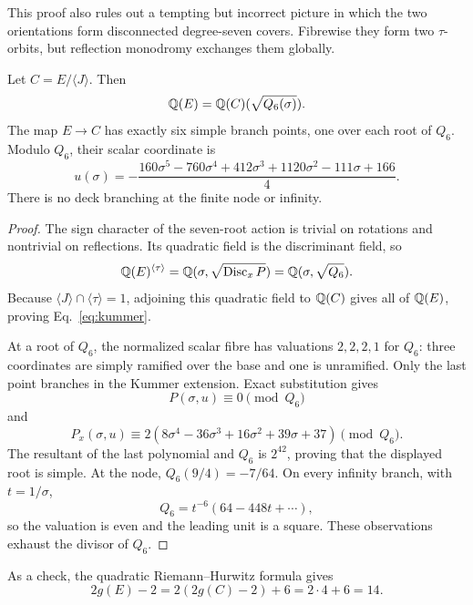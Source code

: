 This proof also rules out a tempting but incorrect picture in which the two
orientations form disconnected degree-seven covers.  Fibrewise they form two
$\tau$-orbits, but reflection monodromy exchanges them globally.

\begin{proposition}\label{prop:branch}
Let $C=E/\langle J\rangle$.  Then
\begin{equation}\label{eq:kummer}
 \mathbb Q(E)=\mathbb Q(C)(\sqrt{Q_6(\sigma)}).
\end{equation}
The map $E\to C$ has exactly six simple branch points, one over each root of
$Q_6$.  Modulo $Q_6$, their scalar coordinate is
\begin{equation}\label{eq:u}
 u(\sigma)=-\frac{
160\sigma^5-760\sigma^4+412\sigma^3+1120\sigma^2
-111\sigma+166}{4}.
\end{equation}
There is no deck branching at the finite node or infinity.
\end{proposition}

\begin{proof}
The sign character of the seven-root action is trivial on rotations and
nontrivial on reflections.  Its quadratic field is the discriminant field,
so
\[
 \mathbb Q(E)^{\langle\tau\rangle}
 =\mathbb Q(\sigma,\sqrt{\operatorname{Disc}_xP})
 =\mathbb Q(\sigma,\sqrt{Q_6}).
\]
Because $\langle J\rangle\cap\langle\tau\rangle=1$, adjoining this quadratic
field to $\mathbb Q(C)$ gives all of $\mathbb Q(E)$, proving Eq.~\eqref{eq:kummer}.

At a root of $Q_6$, the normalized scalar fibre has valuations
$2,2,2,1$ for $Q_6$: three coordinates are simply ramified over the base and
one is unramified.  Only the last point branches in the Kummer extension.
Exact substitution gives
\[
 P(\sigma,u)\equiv0\pmod{Q_6}
\]
and
\[
 P_x(\sigma,u)\equiv
2(8\sigma^4-36\sigma^3+16\sigma^2+39\sigma+37)
\pmod{Q_6}.
\]
The resultant of the last polynomial and $Q_6$ is $2^{42}$, proving that the
displayed root is simple.  At the node, $Q_6(9/4)=-7/64$.  On every infinity
branch, with $t=1/\sigma$,
\[
 Q_6=t^{-6}(64-448t+\cdots),
\]
so the valuation is even and the leading unit is a square.  These observations
exhaust the divisor of $Q_6$.
\end{proof}

As a check, the quadratic Riemann--Hurwitz formula gives
\[
 2g(E)-2=2(2g(C)-2)+6=2\cdot4+6=14.
\]
